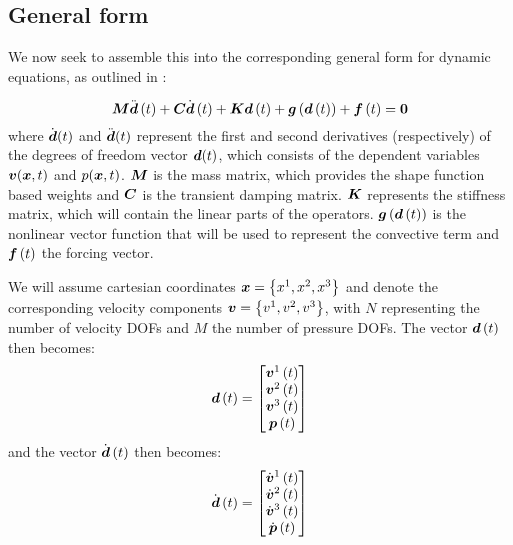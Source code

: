 \subsection{General form}

We now seek to assemble this into the corresponding general form for dynamic equations, as outlined in :

\begin{equation}
  \matr{M}\fnof{\ddot{\vectr{d}}}{t}+\matr{C}\fnof{\dot{\vectr{d}}}{t}+\matr{K}\fnof{\vectr{d}}{t}+
  \fnof{\vectr{g}}{\fnof{\vectr{d}}{t}}+\fnof{\vectr{f}}{t}=\vectr{0}
  \label{eqn:NSEGeneralDynamic}
\end{equation}
where $\dot{ \boldsymbol{d} }(t)$ and $\ddot{ \boldsymbol{d} }(t)$ represent the first and
second derivatives (respectively) of the degrees of freedom vector
$ \boldsymbol{d} (t)$, which consists of the dependent variables
$ \boldsymbol{v} ( \boldsymbol{x} ,t)$ and $p( \boldsymbol{x} ,t)$. $\matr{M}$ is the mass matrix, which
provides the shape function based weights and $\matr{C}$ is the transient
damping matrix. $\matr{K}$ represents the stiffness matrix, which will contain
the linear parts of the operators. $  \boldsymbol{g} \left(   \boldsymbol{d} \left( t \right)  \right) $ is
the nonlinear vector function that will be used to represent the convective
term and $  \boldsymbol{f} \left( t \right) $ the forcing vector.

We will assume cartesian coordinates $ \boldsymbol{x} =\left\{ x^{1},x^{2},x^{3} \right\}$ and denote the
corresponding velocity components $ \boldsymbol{v} =\left\{ v^{1},v^{2},v^{3} \right\}$, with $N$
representing the number of velocity DOFs and $M$ the number of pressure
DOFs. The vector $  \boldsymbol{d} \left( t \right) $ then becomes:
\begin{equation}
    \boldsymbol{d} \left( t \right) =\begin{bmatrix}
    \boldsymbol{v} ^{1}\left( t \right)  \\
    \boldsymbol{v} ^{2}\left( t \right)  \\
    \boldsymbol{v} ^{3}\left( t \right)  \\
    \boldsymbol{p} \left( t \right) 
  \end{bmatrix}
\end{equation}
and the vector $ \dot{ \boldsymbol{d} }\left( t \right) $ then becomes:
\begin{equation}
   \dot{ \boldsymbol{d} }\left( t \right) =\begin{bmatrix}
   \dot{ \boldsymbol{v} }^{1}\left( t \right)  \\
   \dot{ \boldsymbol{v} }^{2}\left( t \right)  \\
   \dot{ \boldsymbol{v} }^{3}\left( t \right)  \\
   \dot{ \boldsymbol{p} }\left( t \right) 
  \end{bmatrix}
\end{equation}

